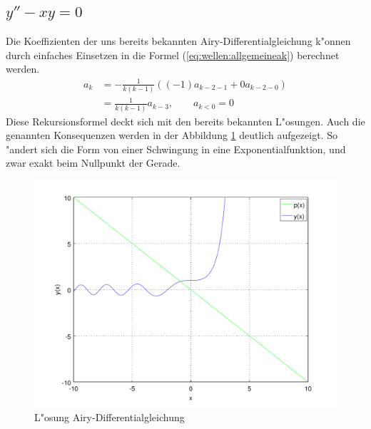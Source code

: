 \subsection{\texorpdfstring{$y''-xy = 0$}{y''-xy = 0}}
Die Koeffizienten der uns bereits bekannten Airy-Differentialgleichung k"onnen 
durch einfaches Einsetzen in die Formel (\ref{eq:wellen:allgemeineak}) 
berechnet werden.
\begin{equation*}
	\begin{split}
		a_k &= -\frac{1}{k(k-1)} ((-1) a_{k-2-1} + 
		0 a_{k-2-0})
		\\
		&= \frac{1}{k(k-1)} a_{k-3}, \qquad a_{k < 0} = 0
	\end{split}
\end{equation*}
Diese Rekursionsformel deckt sich mit den bereits bekannten L"osungen.
Auch die genannten Konsequenzen werden in der Abbildung 
\ref{fig:wellen:airy-dgl} deutlich aufgezeigt. So "andert sich die Form von 
einer Schwingung in eine Exponentialfunktion, und zwar exakt beim Nullpunkt der 
Gerade.

\begin{figure}
	\includegraphics[width=1\hsize]{./wellen/images/allgemein/n1.pdf}
	\caption{L"osung Airy-Differentialgleichung}
	\label{fig:wellen:airy-dgl}
\end{figure}